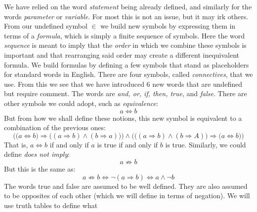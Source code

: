         We have relied on the word \textit{statement} being already defined, and
        similarly for the words \textit{parameter} or \textit{variable}. For most
        this is not an issue, but it may irk others. From our undefined symbol $\in$
        we build new symbols by expressing them in terms of a
        \textit{formula}, which is simply a finite
        sequence of symbols. Here the word \textit{sequence} is meant to imply that
        the \textit{order} in which we combine these symbols is important and that
        rearranging said order may create a different inequivalent formula. We build
        formulas by defining a few symbols that stand as placeholders for standard
        words in English. There are four symbols, called
        \textit{\glspl{connective}}, that we use.
        From this we see that we have introduced 6 new words that are undefined but
        require comment. The words are \textit{and, or, if, then, true}, and
        \textit{false}. There are other symbols we could adopt, such as
        \textit{equivalence}:
        \begin{equation*}
            a\Leftrightarrow{b}
        \end{equation*}
        But from how we shall define these notions, this new symbol is equivalent to
        a combination of the previous ones:
        \begin{equation*}
            \Big(\big(a\Leftrightarrow{b}\big)\Rightarrow
                \big((a\Rightarrow{b})\land(b\Rightarrow{a})\big)\Big)
            \land\Big(\big((a\Rightarrow{b})\land(b\Rightarrow{A})\big)
                \Rightarrow\big(a\Leftrightarrow{b}\big)\Big)
        \end{equation*}
        That is, $a\Leftrightarrow{b}$ if and only if $a$ is true if and only if $b$
        is true. Similarly, we could define \textit{does not imply}:
        \begin{equation*}
            a\not\Rightarrow{b}
        \end{equation*}
        But this is the same as:
        \begin{equation*}
            a\not\Rightarrow{b}\Longleftrightarrow
            \neg(a\Rightarrow{b})
            \Longleftrightarrow
            a\land\neg{b}
        \end{equation*}
        The words true and false are assumed to be well defined. They are also
        assumed to be opposites of each other (which we will define in terms of
        negation). We will use truth tables to define what
